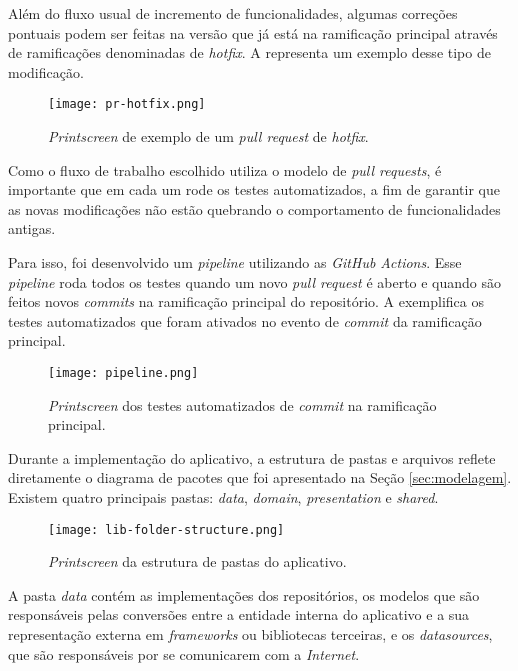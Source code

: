 Além do fluxo usual de incremento de funcionalidades, algumas correções pontuais podem ser feitas na versão que já está na ramificação principal através de ramificações denominadas de \textit{hotfix}. A  representa um exemplo desse tipo de modificação.

\begin{figure}[!htb]
  \centering
  \texttt{[image: pr-hotfix.png]}
  \caption{\textit{Printscreen} de exemplo de um \textit{pull request} de \textit{hotfix}.}
  \label{fig:hotfixpr}
\end{figure}

Como o fluxo de trabalho escolhido utiliza o modelo de \textit{pull requests}, é importante que em cada um rode os testes automatizados, a fim de garantir que as novas modificações não estão quebrando o comportamento de funcionalidades antigas.

Para isso, foi desenvolvido um \textit{pipeline} utilizando as \textit{GitHub Actions}. Esse \textit{pipeline} roda todos os testes quando um novo \textit{pull request} é aberto e quando são feitos novos \textit{commits} na ramificação principal do repositório. A  exemplifica os testes automatizados que foram ativados no evento de \textit{commit} da ramificação principal.

\begin{figure}[!htb]
  \centering
  \texttt{[image: pipeline.png]}
  \caption{\textit{Printscreen} dos testes automatizados de \textit{commit} na ramificação principal.}
  \label{fig:pipelineci}
\end{figure}

Durante a implementação do aplicativo, a estrutura de pastas e arquivos reflete diretamente o diagrama de pacotes que foi apresentado na Seção \ref{sec:modelagem}. Existem quatro principais pastas: \textit{data}, \textit{domain}, \textit{presentation} e \textit{shared}.

\begin{figure}[!htb]
  \centering
  \texttt{[image: lib-folder-structure.png]}
  \caption{\textit{Printscreen} da estrutura de pastas do aplicativo.}
\end{figure}

A pasta \textit{data} contém as implementações dos repositórios, os modelos que são responsáveis pelas conversões entre a entidade interna do aplicativo e a sua representação externa em \textit{frameworks} ou bibliotecas terceiras, e os \textit{datasources}, que são responsáveis por se comunicarem com a \textit{Internet}.


